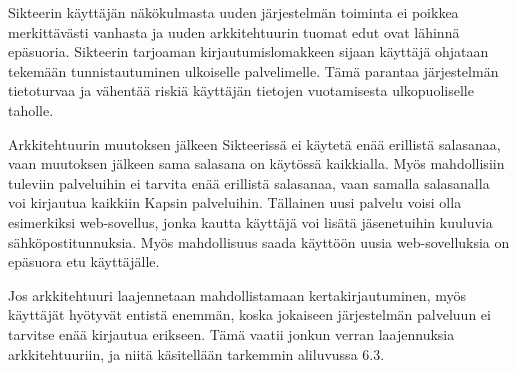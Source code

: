 Sikteerin käyttäjän näkökulmasta uuden järjestelmän toiminta ei poikkea merkittävästi vanhasta ja uuden arkkitehtuurin tuomat edut ovat lähinnä epäsuoria. Sikteerin tarjoaman kirjautumislomakkeen sijaan käyttäjä ohjataan tekemään tunnistautuminen ulkoiselle palvelimelle. Tämä parantaa järjestelmän tietoturvaa ja vähentää riskiä käyttäjän tietojen vuotamisesta ulkopuoliselle taholle.

Arkkitehtuurin muutoksen jälkeen Sikteerissä ei käytetä enää erillistä salasanaa, vaan muutoksen jälkeen sama salasana on käytössä kaikkialla. Myös mahdollisiin tuleviin palveluihin ei tarvita enää erillistä salasanaa, vaan samalla salasanalla voi kirjautua kaikkiin Kapsin palveluihin. Tällainen uusi palvelu voisi olla esimerkiksi web-sovellus, jonka kautta käyttäjä voi lisätä jäsenetuihin kuuluvia sähköpostitunnuksia. Myös mahdollisuus saada käyttöön uusia web-sovelluksia on epäsuora etu käyttäjälle.

Jos arkkitehtuuri laajennetaan mahdollistamaan kertakirjautuminen, myös käyttäjät hyötyvät entistä enemmän, koska jokaiseen järjestelmän palveluun ei tarvitse enää kirjautua erikseen. Tämä vaatii jonkun verran laajennuksia arkkitehtuuriin, ja niitä käsitellään tarkemmin aliluvussa 6.3.